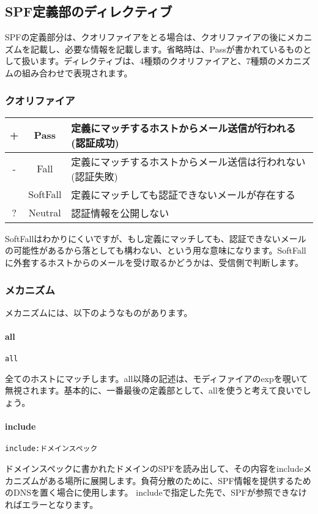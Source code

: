 \subsection{SPF定義部のディレクティブ}

SPFの定義部分は、クオリファイアをとる場合は、クオリファイアの後にメカニズムを記載し、必要な情報を記載します。省略時は、Passが書かれているものとして扱います。ディレクティブは、4種類のクオリファイアと、7種類のメカニズムの組み合わせで表現されます。

\subsubsection{クオリファイア}

\begin{tabular}{c|c|l}
 + & Pass & 定義にマッチするホストからメール送信が行われる(認証成功)\\\hline
 - & Fall & 定義にマッチするホストからメール送信は行われない(認証失敗)\\\hline
 ~ & SoftFall & 定義にマッチしても認証できないメールが存在する\\\hline
 ? & Neutral & 認証情報を公開しない\\\hline
\end{tabular}


SoftFallはわかりにくいですが、もし定義にマッチしても、認証できないメールの可能性があるから落としても構わない、という用な意味になります。SoftFallに外套するホストからのメールを受け取るかどうかは、受信側で判断します。

\subsubsection{メカニズム}

メカニズムには、以下のようなものがあります。

\paragraph{all}
\begin{verbatim}
all
\end{verbatim}
全てのホストにマッチします。all以降の記述は、モディファイアのexpを覗いて無視されます。基本的に、一番最後の定義部として、allを使うと考えて良いでしょう。

\paragraph{include}
\begin{verbatim}
include:ドメインスペック
\end{verbatim}
ドメインスペックに書かれたドメインのSPFを読み出して、その内容をincludeメカニズムがある場所に展開します。負荷分散のために、SPF情報を提供するためのDNSを置く場合に使用します。
includeで指定した先で、SPFが参照できなければエラーとなります。

